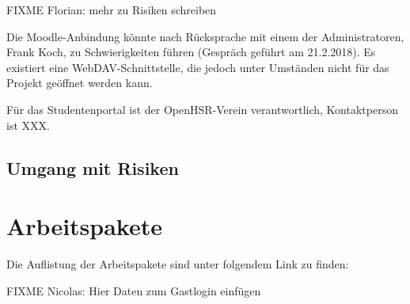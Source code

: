\documentclass[a4paper]{article}
\begin{document}
FIXME Florian: mehr zu Risiken schreiben

Die Moodle-Anbindung könnte nach Rücksprache mit einem der Administratoren, Frank Koch, zu Schwierigkeiten führen (Gespräch geführt am 21.2.2018). Es existiert eine WebDAV-Schnittstelle, die jedoch unter Umständen nicht für das Projekt geöffnet werden kann.

Für das Studentenportal ist der OpenHSR-Verein verantwortlich, Kontaktperson ist XXX.

\subsection{Umgang mit Risiken}

\section{Arbeitspakete}

Die Auflistung der Arbeitspakete sind unter folgendem Link zu finden:

FIXME Nicolas: Hier Daten zum Gastlogin einfügen

%
%
%
%
\end{document}
